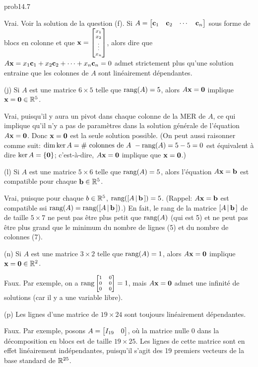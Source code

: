 \begin{sol}{prob14.7}
\medskip

\soln Vrai. Voir la solution de la question (f). Si $A= \bmatrix \cc_1&\cc_2&\cdots &\cc_n\endbmatrix$ sous forme de blocs en colonne et que $\xx= \scriptsize\bmatrix x_1\\x_2\\ \vdots\\x_n\endbmatrix$, alors dire que $A\mathbf{x}= x_1 \mathbf{c}_1 + x_2 \mathbf{c}_2 +\cdots +x_n\mathbf{c}_n=0$ admet strictement plus qu'une solution entraine que les colonnes de $A$ sont lin\'eairement d\'ependantes.
 
\medskip

(j) Si $A$ est une matrice $6 \times 5$ telle que $\textrm{rang}(A)=5$, alors $A\mathbf{x}=\mathbf{0}$ implique $\mathbf{x}=\mathbf{0}\in \mathbb{R}^5$.
\medskip

\soln Vrai, puisqu'il y aura un pivot dans chaque colonne de la MER de $A$, ce qui implique qu'il n'y a pas de paramètres dans la solution générale de l'équation $A\mathbf{x}=\mathbf{0}$. Donc $\mathbf{x}=\mathbf{0}$ est la seule solution possible. (On peut aussi raisonner comme suit: $\dim \ker A= \#\text{ colonnes de $A$ } -\textrm{rang} (A)=5-5=0$ est \'equivalent \`a dire $\ker A=\{\mathbf{0}\}$; c'est-\`a-dire, $A\mathbf{x}=\mathbf{0}$ implique que $\mathbf{x}=\mathbf{0}$.)
\medskip
 

(l) Si $A$ est une matrice $5 \times 6$ telle que $\textrm{rang}(A)=5$, alors l'équation $A\mathbf{x}=\mathbf{b}$ est compatible pour chaque $\mathbf{b}\in \mathbb{R}^5$.
\medskip

\soln Vrai, puisque pour chaque $b \in \mathbb{R}^5$, $\textrm{rang} ([A\,|\,\mathbf{b}\,])=5$. (Rappel: $A\mathbf{x}=\mathbf{b}$ est compatible ssi $\textrm{rang} (A)=\textrm{rang} ([A\,|\,\mathbf{b}\,])$.) En fait, le rang de la matrice $[A\,|\,\mathbf{b}\,]$ de de taille $5 \times 7$ ne peut pas être plus petit que $\textrm{rang} (A)$ (qui est 5) et ne peut pas être plus grand que le minimum du nombre de lignes (5) et du nombre de colonnes (7). 
\medskip
 

(n) Si $A$ est une matrice $3 \times 2$ telle que $\textrm{rang}(A)=1$, alors $A\mathbf{x}=\mathbf{0}$ implique $\mathbf{x}=\mathbf{0}\in \mathbb{R}^2$.
\medskip

\soln Faux. Par exemple, on a  $\rank \scriptsize\bmatrix 1 & 0  \\
 0 & 0 \\0 & 0 \endbmatrix=1
 $, mais $A\mathbf{x}=\mathbf{0}$ admet une infinit\'e de solutions (car il y a une variable libre).
\medskip
 

(p) Les lignes d'une matrice de $19 \times 24$ sont toujours linéairement dépendantes.
\medskip

\soln Faux. Par exemple, posons $A= \bmatrix I_{19}&0\endbmatrix$, où la matrice nulle $0$ dans la d\'ecomposition en blocs est de taille $19 \times 25$. Les lignes de cette matrice sont en effet lin\'eairement indépendantes, puisqu'il s'agit des 19 premiers vecteurs de la base standard de $\mathbb{R}^{25}$.
\medskip




\end{sol}

